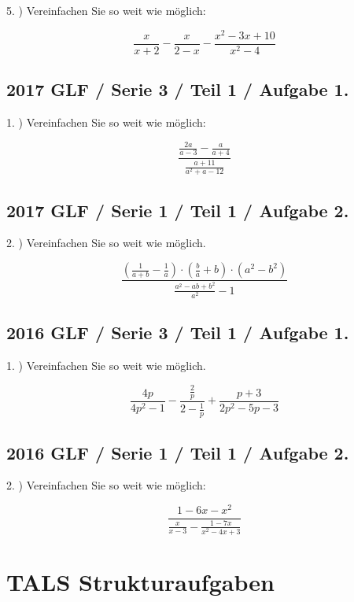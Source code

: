 5. ) Vereinfachen Sie so weit wie möglich:

$$\frac{x}{x+2} - \frac{x}{2-x} - \frac{x^2-3x+10}{x^2-4}  $$

\subsection*{2017 GLF / Serie 3 / Teil 1 / Aufgabe 1.}

1. ) Vereinfachen Sie so weit wie möglich:

$$\frac{\frac{2a}{a-3}-\frac{a}{a+4}}{\frac{a+11}{a^2+a-12}}$$

\subsection*{2017 GLF / Serie 1 / Teil 1 / Aufgabe 2.}

2. ) Vereinfachen Sie so weit wie möglich.

$$\frac{\left(\frac1{a+b} - \frac1a \right) \cdot{} \left(\frac{b}a + b\right) \cdot{} \left(a^2-b^2\right)}{\frac{a^2-ab+b^2}{a^2}-1}$$

\subsection*{2016 GLF / Serie 3 / Teil 1 / Aufgabe 1.}

1. ) Vereinfachen Sie so weit wie möglich.

$$\frac{4p}{4p^2-1} - \frac{\frac2p}{2-\frac1p} + \frac{p+3}{2p^2-5p-3}$$


\subsection*{2016 GLF / Serie 1 / Teil 1 / Aufgabe 2.}

2. ) Vereinfachen Sie so weit wie möglich:

$$\frac{1-6x-x^2}{\frac{x}{x-3} - \frac{1-7x}{x^2-4x+3}}$$

\newpage
\section*{TALS Strukturaufgaben}

